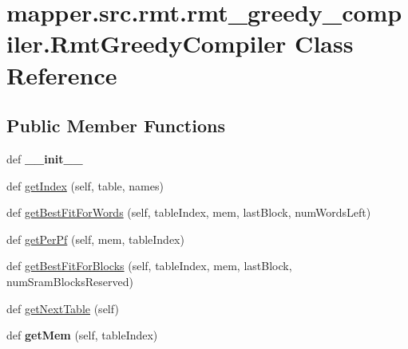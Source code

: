 \hypertarget{classmapper_1_1src_1_1rmt_1_1rmt__greedy__compiler_1_1_rmt_greedy_compiler}{}\section{mapper.\+src.\+rmt.\+rmt\+\_\+greedy\+\_\+compiler.\+Rmt\+Greedy\+Compiler Class Reference}
\label{classmapper_1_1src_1_1rmt_1_1rmt__greedy__compiler_1_1_rmt_greedy_compiler}
\subsection*{Public Member Functions}
\begin{DoxyCompactItemize}
\item 
\hypertarget{classmapper_1_1src_1_1rmt_1_1rmt__greedy__compiler_1_1_rmt_greedy_compiler_a4ec3e834ee75df91095a330477806cd0}{}def {\bfseries \+\_\+\+\_\+init\+\_\+\+\_\+}\label{classmapper_1_1src_1_1rmt_1_1rmt__greedy__compiler_1_1_rmt_greedy_compiler_a4ec3e834ee75df91095a330477806cd0}

\item 
def \hyperlink{classmapper_1_1src_1_1rmt_1_1rmt__greedy__compiler_1_1_rmt_greedy_compiler_aeb2db53582c9e835a96af87fb6ecadd4}{get\+Index} (self, table, names)
\item 
def \hyperlink{classmapper_1_1src_1_1rmt_1_1rmt__greedy__compiler_1_1_rmt_greedy_compiler_a07cf4ee1907b1f1d65b50ae2a0df7485}{get\+Best\+Fit\+For\+Words} (self, table\+Index, mem, last\+Block, num\+Words\+Left)
\item 
def \hyperlink{classmapper_1_1src_1_1rmt_1_1rmt__greedy__compiler_1_1_rmt_greedy_compiler_a5eadae139fff0060c66714bc05f57e02}{get\+Per\+Pf} (self, mem, table\+Index)
\item 
def \hyperlink{classmapper_1_1src_1_1rmt_1_1rmt__greedy__compiler_1_1_rmt_greedy_compiler_a34b2e3bb99ee2426b356194f882c177f}{get\+Best\+Fit\+For\+Blocks} (self, table\+Index, mem, last\+Block, num\+Sram\+Blocks\+Reserved)
\item 
def \hyperlink{classmapper_1_1src_1_1rmt_1_1rmt__greedy__compiler_1_1_rmt_greedy_compiler_a38079b7112774a71291c150d4f8b9a42}{get\+Next\+Table} (self)
\item 
\hypertarget{classmapper_1_1src_1_1rmt_1_1rmt__greedy__compiler_1_1_rmt_greedy_compiler_a45fcf1c9b9707e3a6c21ce4ec078f256}{}def {\bfseries get\+Mem} (self, table\+Index)\label{classmapper_1_1src_1_1rmt_1_1rmt__greedy__compiler_1_1_rmt_greedy_compiler_a45fcf1c9b9707e3a6c21ce4ec078f256}


\end{DoxyCompactItemize}
